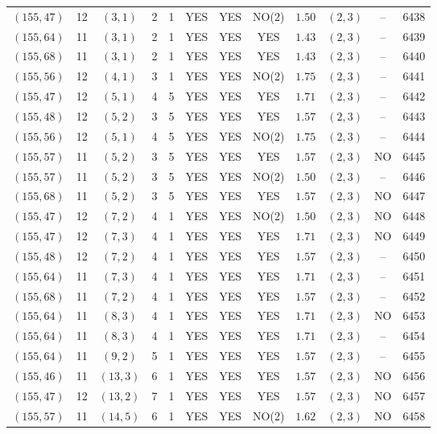 \begin{longtable}{|c|c|c|c|c|c|c|c|c|c|c|c|}
$(155,47)$ & 12 & $(3,1)$ & 2 & 1 & YES & YES & NO(2) & $1.50$ & $(2,3)$ & -- & 6438\\
$(155,64)$ & 11 & $(3,1)$ & 2 & 1 & YES & YES & YES & $1.43$ & $(2,3)$ & -- & 6439\\
$(155,68)$ & 11 & $(3,1)$ & 2 & 1 & YES & YES & YES & $1.43$ & $(2,3)$ & -- & 6440\\
$(155,56)$ & 12 & $(4,1)$ & 3 & 1 & YES & YES & NO(2) & $1.75$ & $(2,3)$ & -- & 6441\\
$(155,47)$ & 12 & $(5,1)$ & 4 & 5 & YES & YES & YES & $1.71$ & $(2,3)$ & -- & 6442\\
$(155,48)$ & 12 & $(5,2)$ & 3 & 5 & YES & YES & YES & $1.57$ & $(2,3)$ & -- & 6443\\
$(155,56)$ & 12 & $(5,1)$ & 4 & 5 & YES & YES & NO(2) & $1.75$ & $(2,3)$ & -- & 6444\\
$(155,57)$ & 11 & $(5,2)$ & 3 & 5 & YES & YES & YES & $1.57$ & $(2,3)$ & NO & 6445\\
$(155,57)$ & 11 & $(5,2)$ & 3 & 5 & YES & YES & NO(2) & $1.50$ & $(2,3)$ & -- & 6446\\
$(155,68)$ & 11 & $(5,2)$ & 3 & 5 & YES & YES & YES & $1.57$ & $(2,3)$ & NO & 6447\\
$(155,47)$ & 12 & $(7,2)$ & 4 & 1 & YES & YES & NO(2) & $1.50$ & $(2,3)$ & NO & 6448\\
$(155,47)$ & 12 & $(7,3)$ & 4 & 1 & YES & YES & YES & $1.71$ & $(2,3)$ & NO & 6449\\
$(155,48)$ & 12 & $(7,2)$ & 4 & 1 & YES & YES & YES & $1.57$ & $(2,3)$ & -- & 6450\\
$(155,64)$ & 11 & $(7,3)$ & 4 & 1 & YES & YES & YES & $1.71$ & $(2,3)$ & -- & 6451\\
$(155,68)$ & 11 & $(7,2)$ & 4 & 1 & YES & YES & YES & $1.57$ & $(2,3)$ & -- & 6452\\
$(155,64)$ & 11 & $(8,3)$ & 4 & 1 & YES & YES & YES & $1.71$ & $(2,3)$ & NO & 6453\\
$(155,64)$ & 11 & $(8,3)$ & 4 & 1 & YES & YES & YES & $1.71$ & $(2,3)$ & -- & 6454\\
$(155,64)$ & 11 & $(9,2)$ & 5 & 1 & YES & YES & YES & $1.57$ & $(2,3)$ & -- & 6455\\
$(155,46)$ & 11 & $(13,3)$ & 6 & 1 & YES & YES & YES & $1.57$ & $(2,3)$ & NO & 6456\\
$(155,47)$ & 12 & $(13,2)$ & 7 & 1 & YES & YES & YES & $1.57$ & $(2,3)$ & NO & 6457\\
$(155,57)$ & 11 & $(14,5)$ & 6 & 1 & YES & YES & NO(2) & $1.62$ & $(2,3)$ & NO & 6458\\

\end{longtable}
